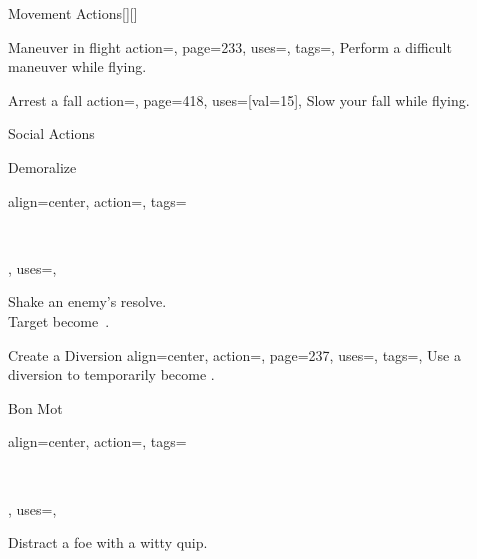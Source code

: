 \begin{PageBackLandscape}
\begin{TablesHalf}{\backTableHeight}
\begin{Table}{Movement Actions}[][]
\begin{entry}{Maneuver in flight}{%
                action=,
                page=233,
                uses={\Acrobatics[tags={T}]},
                tags=\Move,
            }
                Perform a difficult maneuver while flying.\hfill {}\quad
            \end{entry}
            \begin{entry}{Arrest a fall}{%
                action=,
                page=418,
                uses={[val=15]},
            }
                Slow your fall while flying.
            \end{entry}
        \end{Table}
        \TableSpace
        \begin{Table}{Social Actions}
            \begin{entry}{Demoralize}{%
                align=center,
                action=,
                tags=\parbox{0.52\linewidth}{\raggedleft{}\,\Concentrate\\\Mental\Emotion\Fear},
                uses=\InitimidationWill,
            }
                Shake an enemy's resolve. \Auditory \ \hfill
                \\
                Target become \Frightened\,.\hfill
            \end{entry}
            \begin{entry}{Create a Diversion}{%
                align=center,
                action=,
                page=237,
                uses=\DeceptionPerception,
                tags=\Mental,
            }
                Use a diversion to temporarily become \Hidden.\hfill
                \\
            \end{entry}
            \begin{entry}{Bon Mot}{%
                align=center,
                action=,
                tags=\parbox{0.5\linewidth}{\raggedleft{}\,\Concentrate\\\Auditory\Linguistic},
                uses={\DiplomacyWill[tags={T}]\Feat},
            }
                Distract a foe with a witty quip. \Emotion\Mental\hfill {}\\

\end{entry}
\end{Table}
\end{TablesHalf}
\end{PageBackLandscape}
